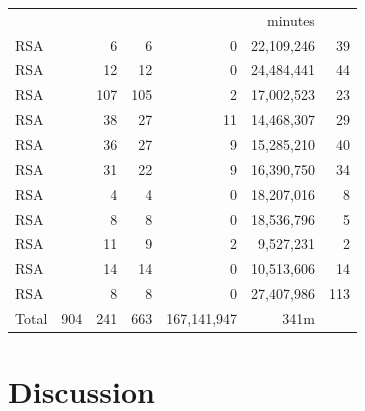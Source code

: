 \begin{table}[]
\begin{tabular}{lrrrrrr}
                         &                        &                     &                      &                 & minutes            \\\cline{6-6}
      RSA &           & 6                       & 6                   & 0                    & 22,109,246    & 39      \\
      RSA &            & 12                      & 12                  & 0                    & 24,484,441    & 44        \\
      RSA &           & 107                    & 105                 & 2                    & 17,002,523   & 23  \\
      RSA &           & 38                     & 27                  & 11                   & 14,468,307   & 29    \\
      RSA &           & 36                     & 27                  & 9                    & 15,285,210   & 40      \\
      RSA &          & 31                     & 22                  & 9                    & 16,390,750   & 34      \\
      RSA &         & 4                      &  4                  & 0                    & 18,207,016   & 8         \\
      RSA &            & 8                      &  8                  & 0                    & 18,536,796    & 5       \\
      RSA & & 11& 9& 2& 9,527,231& 2 \\
      RSA & & 14& 14& 0& 10,513,606& 14  \\
      RSA &        & 8                      &  8                  & 0                    & 27,407,986    & 113    \\

      Total              & 904                    & 241                 & 663                & 167,141,947      & 341m  \\\hline
  \end{tabular}
\end{table}


\section{Discussion}


